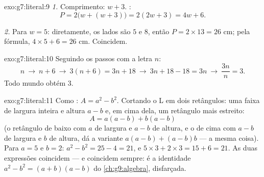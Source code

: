 \begin{solution}{exo:g7:literal:9}
\emph{1.} Comprimento: $w + 3$. :
\[
P = 2\bigl(w + (w + 3)\bigr) = 2(2w + 3) = 4w + 6 .
\]

\emph{2.} Para $w = 5$: diretamente, os lados são $5$ e $8$, então
$P = 2 \times 13 = 26$ cm; pela fórmula, $4 \times 5 + 6 = 26$ cm.
Coincidem.
\end{solution}

\begin{solution}{exo:g7:literal:10}
Seguindo os passos com a letra $n$:
\[
n \ \to\ n + 6 \ \to\ 3(n + 6) = 3n + 18 \ \to\ 3n + 18 - 18 = 3n
\ \to\ \frac{3n}{n} = 3 .
\]
Todo mundo obtém $3$.
\end{solution}

\begin{solution}{exo:g7:literal:11}
Como : $A = a^2 - b^2$. Cortando o L em dois retângulos: uma
faixa de largura inteira e altura $a - b$ e, em cima dela, um retângulo
mais estreito:
\[
A = a(a - b) + b(a - b)
\]
(o retângulo de baixo com $a$ de largura e $a - b$ de altura, e o de
cima com $a - b$ de largura e $b$ de altura, dá a variante
$a(a-b) + (a-b)b$ --- a mesma coisa). Para $a = 5$ e $b = 2$:
$a^2 - b^2 = 25 - 4 = 21$, e $5 \times 3 + 2 \times 3 = 15 + 6 = 21$.
As duas expressões coincidem --- e coincidem sempre: é a identidade
$a^2 - b^2 = (a + b)(a - b)$ do \cref{ch:g9:algebra}, disfarçada.
\end{solution}

